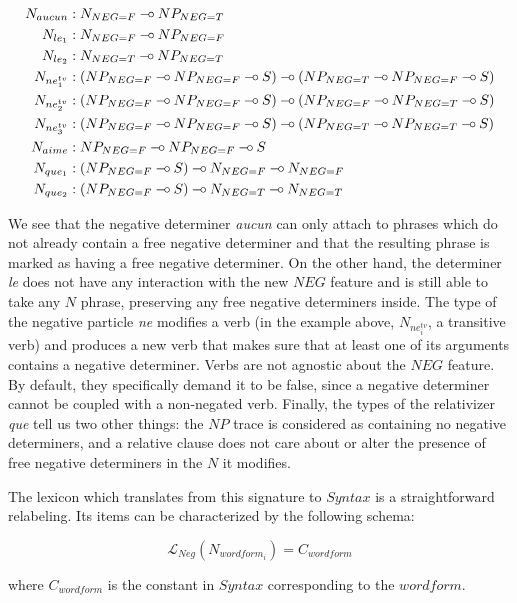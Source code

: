 \documentclass{llncs}
\def\limp {\mathbin{{-}\mkern-3.5mu{\circ}}}
\begin{document}
\begin{align*}
N_{aucun} &: N_{NEG{=}F} \limp NP_{NEG{=}T} \\
N_{le_1} &: N_{NEG{=}F} \limp NP_{NEG{=}F} \\
N_{le_2} &: N_{NEG{=}T} \limp NP_{NEG{=}T} \\
N_{ne^{tv}_1} &: (NP_{NEG{=}F} \limp NP_{NEG{=}F} \limp S) \limp (NP_{NEG{=}T} \limp NP_{NEG{=}F} \limp S) \\
N_{ne^{tv}_2} &: (NP_{NEG{=}F} \limp NP_{NEG{=}F} \limp S) \limp (NP_{NEG{=}F}
\limp NP_{NEG{=}T} \limp S) \\
N_{ne^{tv}_3} &: (NP_{NEG{=}F} \limp NP_{NEG{=}F} \limp S) \limp (NP_{NEG{=}T}
\limp NP_{NEG{=}T} \limp S) \\
N_{aime} &: NP_{NEG{=}F} \limp NP_{NEG{=}F} \limp S \\
N_{que_1} &: (NP_{NEG{=}F} \limp S) \limp N_{NEG{=}F} \limp N_{NEG{=}F} \\
N_{que_2} &: (NP_{NEG{=}F} \limp S) \limp N_{NEG{=}T} \limp N_{NEG{=}T} \\
\end{align*}

We see that the negative determiner \emph{aucun} can only attach to phrases
which do not already contain a free negative determiner and that the resulting
phrase is marked as having a free negative determiner. On the other hand, the
determiner \emph{le} does not have any interaction with the new $NEG$ feature
and is still able to take any $N$ phrase, preserving any free negative
determiners inside. The type of the negative particle \emph{ne} modifies a
verb (in the example above, $N_{ne^{tv}_i}$, a transitive verb) and produces a
new verb that makes sure that at least one of its arguments contains a
negative determiner. Verbs are not agnostic about the $NEG$ feature. By
default, they specifically demand it to be false, since a negative determiner
cannot be coupled with a non-negated verb. Finally, the types of the
relativizer \emph{que} tell us two other things: the $NP$ trace is considered
as containing no negative determiners, and a relative clause does not care
about or alter the presence of free negative determiners in the $N$ it
modifies.

The lexicon which translates from this signature to $Syntax$ is a
straightforward relabeling. Its items can be characterized by the following
schema:

$$
\mathcal{L}_{Neg}(N_{wordform_{i}}) = C_{wordform}
$$

where $C_{wordform}$ is the constant in $Syntax$ corresponding to the
$wordform$.
\end{document}
